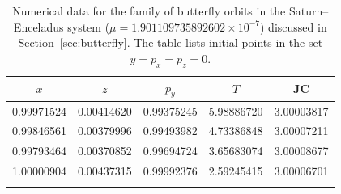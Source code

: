 \documentclass[pdflatex,sn-mathphys-ay]{sn-jnl}%
\theoremstyle{thmstyleone}%
\theoremstyle{thmstyletwo}%
\theoremstyle{thmstylethree}%
\begin{document}
\begin{table}[!h]
\centering
\caption{
Numerical data for the family of butterfly orbits in the Saturn--Enceladus system ($\mu=1.901109735892602 \times 10^{-7}$) discussed in Section~\ref{sec:butterfly}.
The table lists initial points in the set $y = p_x = p_z = 0$.
}
\scriptsize
\label{tbl:data-butterfly}
\begin{tabular}{ccccc}
\toprule
$x$ & $z$ & $p_y$ & $T$ & JC \\ 
\midrule
\midrule
0.99971524 & 0.00414620 & 0.99375245 & 5.98886720 & 3.00003817 \\
0.99846561 & 0.00379996 & 0.99493982 & 4.73386848 & 3.00007211 \\
0.99793464 & 0.00370852 & 0.99694724 & 3.65683074 & 3.00008677 \\
1.00000904 & 0.00437315 & 0.99992376 & 2.59245415 & 3.00006701 \\
\botrule
\end{tabular}
\end{table}
\end{document}
